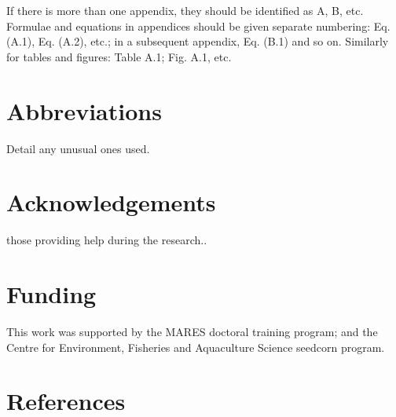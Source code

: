 \documentclass[review]{elsarticle}
\begin{document}
If there is more than one appendix, they should be identified as A, B, etc.
Formulae and equations in appendices should be given separate numbering: Eq.
(A.1), Eq. (A.2), etc.; in a subsequent appendix, Eq. (B.1) and so on.
Similarly for tables and figures: Table A.1; Fig. A.1, etc.

\section*{Abbreviations} Detail any unusual ones used.

\section*{Acknowledgements} those providing help during the research..

\section*{Funding} This work was supported by the MARES doctoral training
program; and the Centre for Environment, Fisheries and Aquaculture Science
seedcorn program.




\section*{References}


\end{document}
